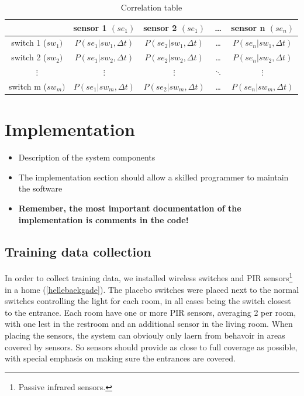 \begin{table}[htbp]
\begin{minipage}{\linewidth}
\setlength{\tymax}{0.5\linewidth}
\centering
\small
\caption{Correlation table}
\label{ctable}
\begin{tabulary}{\textwidth}{@{}ccccc@{}} \toprule
&sensor 1 $(se_1)$&sensor 2 $(se_1)$&{\ldots}&sensor n $(se_n)$\\
\midrule
switch 1 ($sw_1)$&$P(se_1 | sw_1, \Delta t)$&$P(se_2 | sw_1, \Delta t)$&{\ldots}&$P(se_n | sw_1, \Delta t)$\\
switch 2 ($sw_2)$&$P(se_1 | sw_2, \Delta t)$&$P(se_2 | sw_2, \Delta t)$&{\ldots}&$P(se_n | sw_2, \Delta t)$\\
$\vdots$&$\vdots$&$\vdots$&$\ddots$&$\vdots$\\
switch m ($sw_m)$&$P(se_1 | sw_m, \Delta t)$&$P(se_2 | sw_m, \Delta t)$&{\ldots}&$P(se_n | sw_m, \Delta t)$\\

\bottomrule

\end{tabulary}
\end{minipage}
\end{table}


\chapter{Implementation}
\label{implementation}

\begin{itemize}
\item Description of the system components

\item The implementation section should allow a skilled programmer to maintain the software

\item \textbf{Remember, the most important documentation of the implementation is comments in the code!}

\end{itemize}

\section{Training data collection}
\label{trainingdatacollection}

In order to collect training data, we installed wireless switches and PIR sensors\footnote{Passive infrared sensors.} in a home (\autoref{hellebaekgade}). The placebo switches were placed next to the normal switches controlling the light for each room, in all cases being the switch closest to the entrance. Each room have one or more PIR sensors, averaging 2 per room, with one lest in the restroom and an additional sensor in the living room. When placing the sensors, the system can obviouly only laern from behavoir in areas covered by sensors. So sensors should provide as close to full coverage as possible, with special emphasis on making sure the entrances are covered.


